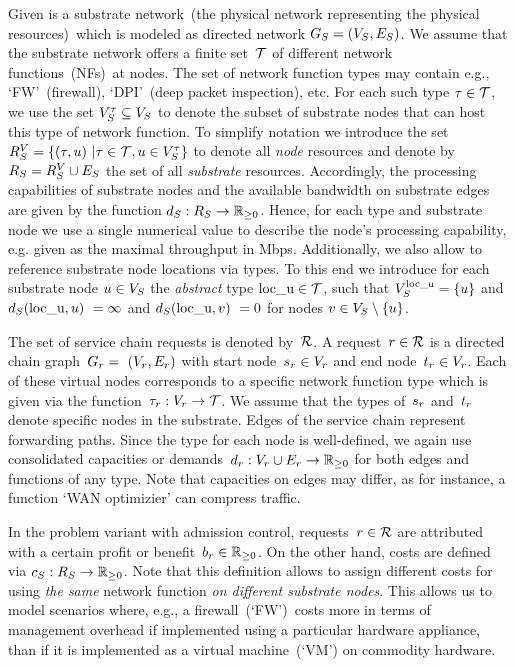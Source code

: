 \documentclass[10pt, conference, letterpaper]{IEEEtran}
\begin{document}
Given is a substrate network~(the physical network representing
the physical resources)~which is modeled as directed network 
$\SG =(\SV, \SE)$. We assume that the substrate network 
offers a finite set~$\types$ of different network 
functions~(NFs)~at nodes. The set of network function types may contain e.g., `FW'~(firewall), `DPI'~(deep packet inspection), etc. For each such type $\type \in \types$, we use the set $\SVTypes \subseteq \SV$ to denote the subset of substrate nodes that can host this type of 
network function. To simplify notation we introduce the set $\SRV = \{(\type, u)~| \type \in \types, u \in \SVTypes\}$ to denote all \emph{node} resources and denote by $\SR = \SRV \cup \SE$ the set of all \emph{substrate} resources.
Accordingly, the processing capabilities of substrate nodes and the available bandwidth on substrate edges are given by the function $\Scap: \SR \to \preals$. Hence, for each type and substrate node we use a single numerical value to describe the node's processing capability, e.g. given as the maximal throughput in Mbps. 
Additionally, we also allow to reference substrate node locations via types. To this end we introduce for each substrate node $u \in \SV$ the \emph{abstract} type $\textnormal{loc\_u} \in \types$, such that $\SVTypes[\textnormal{loc\_u}] = \{u\}$ and~$\Scap(\textnormal{loc\_u},u)~= \infty$ and $\Scap(\textnormal{loc\_u},v)~= 0$ for nodes $v \in \SV \setminus \{u\}$. 


The set of service chain requests is denoted by~$\requests$. 
A request~$\req \in \requests$ is a directed chain graph~$\VG =~(\VV,\VE)$ 
with start node~$\Vstart \in \VV$ and end node~$\Vend \in \VV$. 
Each of these virtual nodes corresponds to a specific network function type 
which is given via the function~$\Vtype : \VV \to \types$. We assume 
that the types of~$\Vstart$ and~$\Vend$ denote specific nodes in the substrate. 
Edges of the service chain represent forwarding paths. 
Since the type for each node is well-defined, we again use consolidated 
capacities or demands~$\Vcap : \VV \cup \VE \to \preals$ for both edges and functions of any type. 
Note that capacities on edges may differ, as for instance, a 
function `WAN optimizier' can compress traffic. 

In the problem variant with admission control, requests~$\req \in \requests$ are attributed with a 
certain profit or benefit~$\Vprofit \in \preals$. On the other hand, costs are defined via $\Scost: \SR \to \preals$. Note that this definition allows to assign different costs for using \emph{the same} network function \emph{on different substrate nodes}. This allows us to model 
scenarios where, e.g., 
a firewall~(`FW')~costs more in terms of management overhead if implemented using a particular hardware appliance, than 
if it is implemented as a virtual machine~(`VM')
on commodity hardware.
\end{document}
